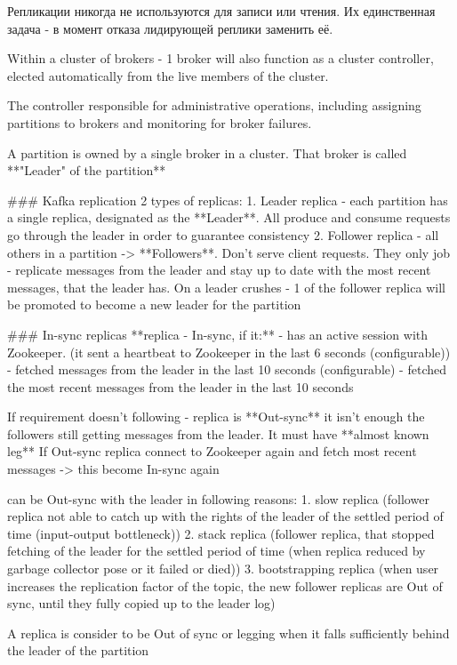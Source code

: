 Репликации никогда не используются для записи или чтения.
Их единственная задача - в момент отказа лидирующей реплики заменить её.


Within a cluster of brokers - 1 broker will also function as a cluster controller, elected automatically from the live members of the cluster.

The controller responsible for administrative operations, including assigning partitions to brokers and monitoring for broker failures.

A partition is owned by a single broker in a cluster. That broker is called **"Leader" of the partition**

### Kafka replication
2 types of replicas:
1. Leader replica - each partition has a single replica, designated as the **Leader**. All produce and consume requests go through the leader in order to guarantee consistency
2. Follower replica - all others in a partition -> **Followers**. Don't serve client requests. They only job - replicate messages from the leader and stay up to date with the most recent messages, that the leader has. On a leader crushes - 1 of the follower replica will be promoted to become a new leader for the partition

### In-sync replicas
**replica - In-sync, if it:**
- has an active session with Zookeeper. (it sent a heartbeat to Zookeeper in the last 6 seconds (configurable))
- fetched messages from the leader in the last 10 seconds (configurable)
- fetched the most recent messages from the leader in the last 10 seconds

If requirement doesn't following - replica is **Out-sync**
it isn't enough the followers still getting messages from the leader. It must have **almost known leg**
If Out-sync replica connect to Zookeeper again and fetch most recent messages -> this become In-sync again


can be Out-sync with the leader in following reasons:
1. slow replica (follower replica not able to catch up with the rights of the leader of the settled period of time (input-output bottleneck))
2. stack replica (follower replica, that stopped fetching of the leader for the settled period of time (when replica reduced by garbage collector pose or it failed or died))
3. bootstrapping replica (when user increases the replication factor of the topic, the new follower replicas are Out of sync, until they fully copied up to the leader log)

A replica is consider to be Out of sync or legging when it falls sufficiently behind the leader of the partition

